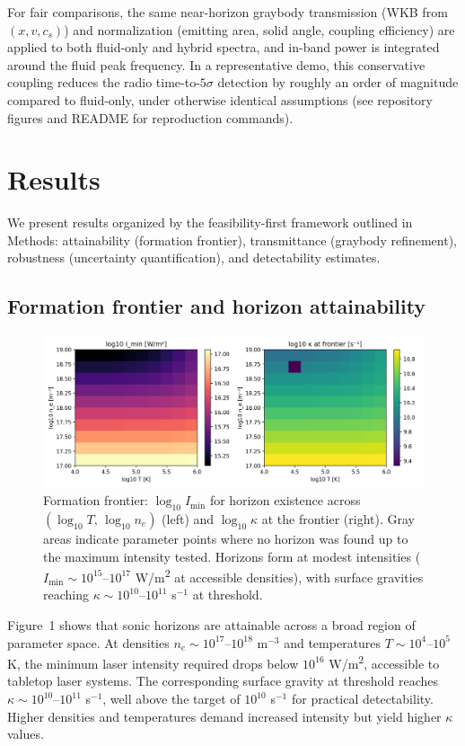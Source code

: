 \documentclass[11pt]{article}
\begin{document}
For fair comparisons, the same near-horizon graybody transmission (WKB from $(x,v,c_s)$) and normalization (emitting area, solid angle, coupling efficiency) are applied to both fluid-only and hybrid spectra, and in-band power is integrated around the fluid peak frequency. In a representative demo, this conservative coupling reduces the radio time-to-$5\sigma$ detection by roughly an order of magnitude compared to fluid-only, under otherwise identical assumptions (see repository figures and README for reproduction commands).

\section{Results}
We present results organized by the feasibility-first framework outlined in Methods: attainability (formation frontier), transmittance (graybody refinement), robustness (uncertainty quantification), and detectability estimates.

\subsection{Formation frontier and horizon attainability}
\begin{figure}[h]
  \centering
  \includegraphics[width=0.95\linewidth]{figures/formation_frontier.png}
  \caption{Formation frontier: $\log_{10} I_{\min}$ for horizon existence across $(\log_{10} T,\, \log_{10} n_e)$ (left) and $\log_{10} \kappa$ at the frontier (right). Gray areas indicate parameter points where no horizon was found up to the maximum intensity tested. Horizons form at modest intensities ($I_{\min} \sim 10^{15}$--$10^{17}$ \si{W/m^2} at accessible densities), with surface gravities reaching $\kappa \sim 10^{10}$--$10^{11}$ s$^{-1}$ at threshold.}
\end{figure}

Figure~1 shows that sonic horizons are attainable across a broad region of parameter space. At densities $n_e \sim 10^{17}$--$10^{18}$ m$^{-3}$ and temperatures $T \sim 10^4$--$10^5$ K, the minimum laser intensity required drops below $10^{16}$ \si{W/m^2}, accessible to tabletop laser systems. The corresponding surface gravity at threshold reaches $\kappa \sim 10^{10}$--$10^{11}$ s$^{-1}$, well above the target of $10^{10}$ s$^{-1}$ for practical detectability. Higher densities and temperatures demand increased intensity but yield higher $\kappa$ values.
\end{document}
